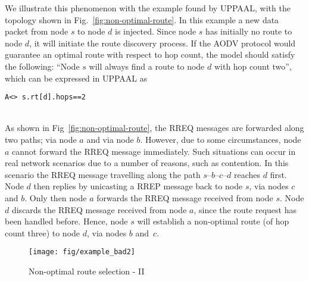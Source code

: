 \documentclass[conference,twoside]{IEEEtran}
\begin{document}
We illustrate this phenomenon with the example found by UPPAAL, with
the topology shown in Fig.~\ref{fig:non-optimal-route}. In this
example a new data packet from node $s$ to node $d$ is
injected. Since node $s$ has initially no route to
node $d$, it will initiate the route discovery process. If the
AODV protocol would guarantee an optimal route with respect to hop count, the model should satisfy the following: ``Node $s$ will always find a route to node $d$ with hop count two'', which can be expressed in UPPAAL as
\\[-2mm]\centerline{\tt A<> s.rt[d].hops==2}\\[2mm]
As shown in Fig~\ref{fig:non-optimal-route}, the RREQ messages are forwarded along two paths; via node $a$ and via node $b$.
However, due to some circumstances, node $a$ cannot forward the RREQ message
immediately.  Such situations can occur in real network scenarios due to a number of reasons, such as contention.
In this scenario the RREQ message travelling along the path $s$--$b$--$c$--$d$ reaches
$d$ first. Node $d$ then replies by unicasting a RREP message back to node $s$, via nodes $c$ and $b$.
Only then node $a$ forwards the RREQ message received from node $s$.
Node $d$ discards the RREQ message received from node $a$, since the route request has been handled before.
Hence, node $s$  will establish a non-optimal route (of hop count three) to node $d$, via nodes $b$ and~$c$.


\begin{figure}[ht]
\vspace{3pt}\centerline{
\texttt{[image: fig/example\_bad2]}}
\caption{Non-optimal route selection - II}
\label{fig:non-optimal-route2}
\vspace{-10pt}
\end{figure}
\end{document}
